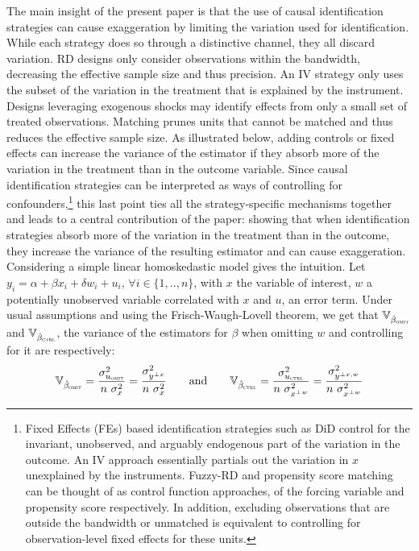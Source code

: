 			The main insight of the present paper is that the use of causal identification strategies can cause exaggeration by limiting the variation used for identification. While each strategy does so through a distinctive channel, they all discard variation. RD designs only consider observations within the bandwidth, decreasing the effective sample size and thus precision. An IV strategy only uses the subset of the variation in the treatment that is explained by the instrument. Designs leveraging exogenous shocks may identify effects from only a small set of treated observations. Matching prunes units that cannot be matched and thus reduces the effective sample size. As illustrated below, adding controls or fixed effects can increase the variance of the estimator if they absorb more of the variation in the treatment than in the outcome variable. Since causal identification strategies can be interpreted as ways of controlling for confounders,\footnote{Fixed Effects (FEs) based identification strategies such as DiD control for the invariant, unobserved, and arguably endogenous part of the variation in the outcome. An IV approach essentially partials out the variation in $x$ unexplained by the instruments. Fuzzy-RD and propensity score matching can be thought of as control function approaches, of the forcing variable and propensity score respectively. In addition, excluding observations that are outside the bandwidth or unmatched is equivalent to controlling for observation-level fixed effects for these units.} this last point ties all the strategy-specific mechanisms together and leads to a central contribution of the paper: showing that when identification strategies absorb more of the variation in the treatment than in the outcome, they increase the variance of the resulting estimator and can cause exaggeration. Considering a simple linear homoskedastic model gives the intuition. Let $y_{i} = \alpha + \beta x_{i} + \delta w_{i} + u_{i}$, $\forall i \in \{1, .., n\}$,  with $x$ the variable of interest, $w$ a potentially unobserved variable correlated with $x$ and $u$, an error term. Under usual assumptions and using the Frisch-Waugh-Lovell theorem, we get that $ \mathbb{V}_{\hat{\beta}_{\textsc{omit}}}$ and $ \mathbb{V}_{\hat{\beta}_{\textsc{ctrl}}}$, the variance of the estimators for $\beta$ when omitting $w$ and controlling for it are respectively:
			~
			\[
				\mathbb{V}_{\hat{\beta}_{\textsc{omit}}} =
				 \dfrac{\sigma^{2}_{u_{\textsc{omit}}}}{n \ \sigma_{x}^{2}} =
				 \dfrac{\sigma^{2}_{y^{\perp x}}}{n \ \sigma_{x}^{2}}
				 \qquad \text{and} \qquad
				 \mathbb{V}_{\hat{\beta}_{\textsc{ctrl}}} = 
				 \dfrac{\sigma^{2}_{u_{\textsc{ctrl}}}}{n \ \sigma_{x^{\perp w}}^{2}} =
				  \dfrac{\sigma^{2}_{y^{\perp x, w}}}{n \ \sigma_{x^{\perp w}}^{2}}
			\]
			
